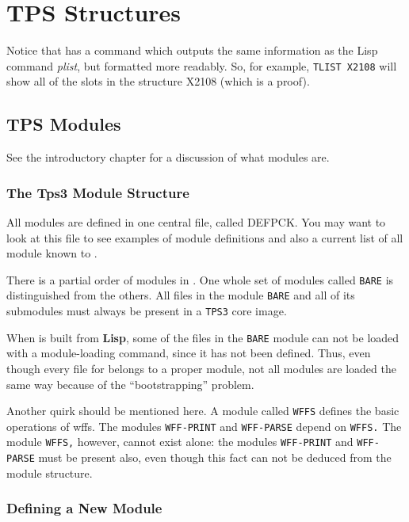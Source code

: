 \chapter{TPS Structures}

Notice that \TPS has a command  which outputs the
same information as the Lisp command {\it plist}, but formatted more
readably. So, for example, {\tt TLIST X2108} will show all of the slots 
in the structure X2108 (which is a proof).
 
\section{TPS Modules}

See the introductory chapter for a discussion of what \TPS modules are.

\subsection{The Tps3 Module Structure}

All modules are defined in one central file, called {\wt DEFPCK}.
You may want to look at this file to see examples of module definitions
and also a current list of all module known to \tps.

There is a partial order of
modules in \tps.  One whole set of modules called {\tt BARE} is
distinguished from the others.  All files in the module {\tt BARE} and all
of its submodules must always be present in a {\tt TPS3} core image.

When \TPS is built from {\bf Lisp}, some of the files in the {\tt BARE}
module can not be loaded with a module-loading command, since
it has not been defined.  Thus, even though every file for \TPS belongs
to a proper module, not all modules are loaded the same way because of
the ``bootstrapping'' problem.

Another quirk should be mentioned here.  A module called {\tt WFFS}
defines the basic operations of wffs.  The modules {\tt WFF-PRINT}
and {\tt WFF-PARSE} depend on {\tt WFFS.}  The module {\tt WFFS,} however,
cannot exist alone: the modules {\tt WFF-PRINT} and {\tt WFF-PARSE} must
be present also, even though this fact can not be deduced from the
module structure.


\subsection{Defining a New Module}

